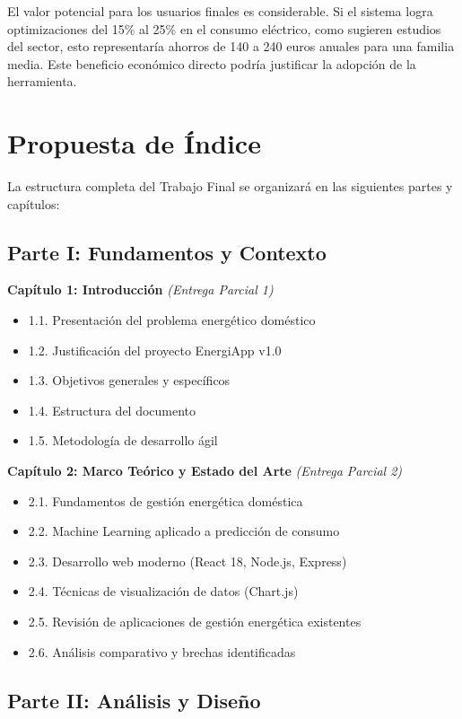 \documentclass[12pt,a4paper,spanish]{article}
\begin{document}
El valor potencial para los usuarios finales es considerable. Si el sistema logra optimizaciones del 15\% al 25\% en el consumo eléctrico, como sugieren estudios del sector, esto representaría ahorros de 140 a 240 euros anuales para una familia media. Este beneficio económico directo podría justificar la adopción de la herramienta.

\section{Propuesta de Índice}

La estructura completa del Trabajo Final se organizará en las siguientes partes y capítulos:

\subsection{Parte I: Fundamentos y Contexto}

\textbf{Capítulo 1: Introducción} \textit{(Entrega Parcial 1)}
\begin{itemize}
    \item 1.1. Presentación del problema energético doméstico
    \item 1.2. Justificación del proyecto EnergiApp v1.0
    \item 1.3. Objetivos generales y específicos
    \item 1.4. Estructura del documento
    \item 1.5. Metodología de desarrollo ágil
\end{itemize}

\textbf{Capítulo 2: Marco Teórico y Estado del Arte} \textit{(Entrega Parcial 2)}
\begin{itemize}
    \item 2.1. Fundamentos de gestión energética doméstica
    \item 2.2. Machine Learning aplicado a predicción de consumo
    \item 2.3. Desarrollo web moderno (React 18, Node.js, Express)
    \item 2.4. Técnicas de visualización de datos (Chart.js)
    \item 2.5. Revisión de aplicaciones de gestión energética existentes
    \item 2.6. Análisis comparativo y brechas identificadas
\end{itemize}

\subsection{Parte II: Análisis y Diseño}
\end{document}
